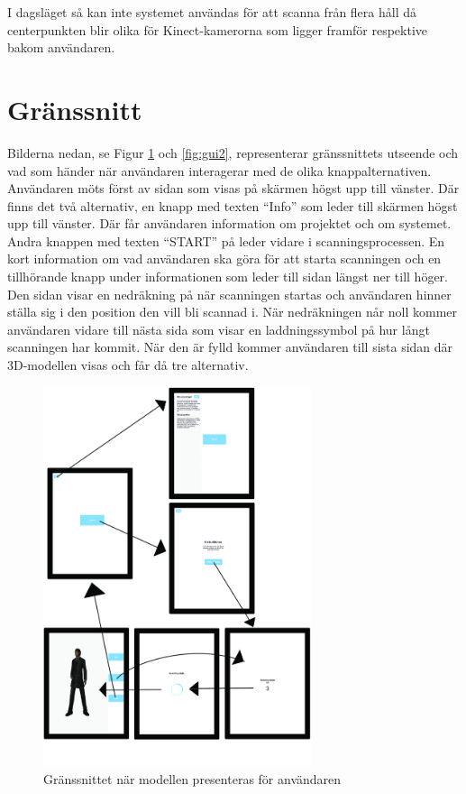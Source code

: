 \documentclass[a4paper,12pt,oneside,final]{extbook}
\begin{document}
I dagsläget så kan inte systemet användas för att scanna från flera håll då centerpunkten blir olika för Kinect-kamerorna som ligger framför respektive bakom användaren.

\section{Gränssnitt}
Bilderna nedan, se Figur \ref{fig:gui1} och \ref{fig:gui2}, representerar gränssnittets utseende och vad som händer när användaren interagerar med de olika knappalternativen. Användaren möts först av sidan som visas på skärmen högst upp till vänster. Där finns det två alternativ, en knapp med texten “Info” som leder till skärmen högst upp till vänster. Där får användaren information om projektet och om systemet. Andra knappen med texten “START” på leder vidare i scanningsprocessen. En kort information om vad användaren ska göra för att starta scanningen och en tillhörande knapp under informationen som leder till sidan längst ner till höger. Den sidan visar en nedräkning på när scanningen startas och användaren hinner ställa sig i den position den vill bli scannad i. När nedräkningen når noll kommer användaren vidare till nästa sida som visar en laddningssymbol på hur långt scanningen har kommit. När den är fylld kommer användaren till sista sidan där 3D-modellen visas och får då tre alternativ.


\begin{figure}[H]
  \centering
  \includegraphics[width=0.7\textwidth]{bilder/granssnitt.jpg}
  \caption{Gränssnittet när modellen presenteras för användaren}
  \label{fig:gui1}
\end{figure}
\end{document}
